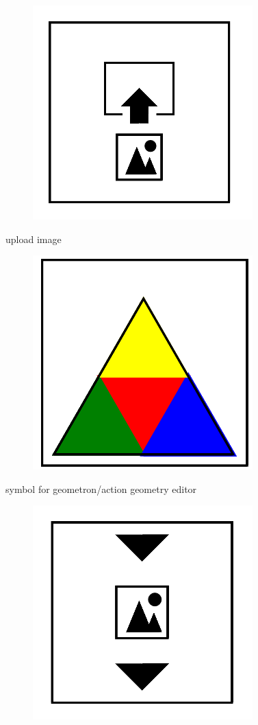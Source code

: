 \documentclass[11pt]{article}
\begin{document}
\begin{figure}
\includegraphics[scale=0.3]{image1.png}
\end{figure}
upload image
\begin{figure}
\includegraphics[scale=0.3]{image2.png}
\end{figure}
symbol for geometron/action geometry editor
\begin{figure}
\includegraphics[scale=0.3]{image3.png}
\end{figure}
\end{document}
